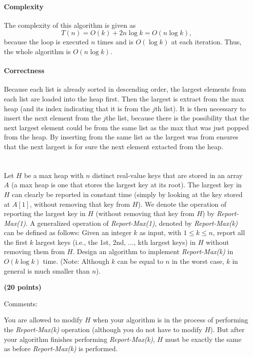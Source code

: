 \documentclass{article}
\begin{document}
\paragraph{Complexity}
The complexity of this algorithm is given as
\begin{equation}
  T(n) = O(k) + 2n\log k = O(n\log k),
\end{equation}
because the loop is executed $n$ times and is $O(\log k)$ at each
iteration.  Thus, the whole algorithm is $O(n\log k)$.

\paragraph{Correctness}
Because each list is already sorted in descending order, the largest
elements from each list are loaded into the heap first.  Then the
largest is extract from the max heap (and its index indicating that it
is from the $j$th list).  It is then necessary to insert
the next element from the $j$the list, because there is the
possibility that the next largest element could be from the same list
as the max that was just popped from the heap.  By inserting from the
same list as the largest was from ensures that the next largest is for
sure the next element extacted from the heap. 



\section{}
 Let $H$ be a max heap with $n$ distinct real-value keys that are
 stored in an array $A$ (a max heap is one that stores the largest key
 at its root). The largest key in $H$ can clearly be reported in
 constant time (simply by looking at the key stored at $A[1]$, without
 removing that key from $H$). We denote the operation of reporting the
 largest key in $H$ (without removing that key from $H$) by
 \emph{Report-Max(1)}. A generalized operation of
 \emph{Report-Max(1)}, denoted by \emph{Report-Max(k)} can be defined
 as follows: Given an integer $k$ as input, with $1 \le k \le n$,
 report all the first $k$ largest keys (i.e., the 1st, 2nd, ..., kth
 largest keys) in $H$ without removing them from $H$. Design an
 algorithm to implement \emph{Report-Max(k)} in $O(k\log k)$
 time. (Note: Although $k$ can be equal to $n$ in the worst case, $k$
 in general is much smaller than $n$). {\bf (20 points)

Comments:} You are allowed to modify $H$ when your algorithm is in the
process of performing the \emph{Report-Max(k)} operation (although you
do not have to modify $H$). But after your algorithm finishes
performing \emph{Report-Max(k)}, $H$ must be exactly the same as
before \emph{Report-Max(k)} is performed.
\end{document}
